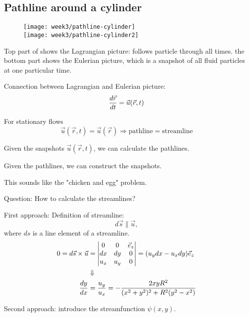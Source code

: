 \newpage
\subsection{Pathline around a cylinder}

\begin{figure}[!h]
    \centering
    \texttt{[image: week3/pathline-cylinder]}\\
    \texttt{[image: week3/pathline-cylinder2]}
    \caption{}
    \label{fig:pathline-cylinder}
\end{figure}

Top part of  shows the Lagrangian picture: follows particle through all times. the bottom part shows the Eulerian picture, which is a snapshot of all fluid particles at one particular time.

Connection between Lagrangian and Eulerian picture:
\begin{equation}
\frac{d \vec{r}}{d t} = \vec{u}(\vec{r},t)
\end{equation}

For stationary flows
\begin{equation}
\vec{u}(\vec{r},t)=\vec{u}(\vec{r}) \Rightarrow \mathrm{pathline} = \mathrm{streamline}
\end{equation}

Given the snapshots $\vec{u}(\vec{r},t)$, we can calculate the pathlines.

Given the pathlines, we can construct the snapshots.

This sounds like the "chicken and egg" problem.

\bigskip
Question: How to calculate the streamlines?

First approach:
Definition of streamline:
\begin{equation}
d\vec{s}\parallel\vec{u},
\end{equation}
where $ds$ is a line element of a streamline.
\begin{align}
0=d\vec{s}\times\vec{u} &=
\begin{vmatrix}
0 & 0 & \vec{e}_z \\
dx & dy & 0 \\
u_x & u_y & 0
\end{vmatrix} =
(u_ydx-u_xdy)\vec{e}_z\\
&\Downarrow\notag\\
\frac{d y}{d x} &= \frac{u_y}{u_x} = -\frac{2xyR^2}{(x^2+y^2)^2+R^2(y^2-x^2)}
\end{align}

Second approach: introduce the streamfunction $\psi(x,y)$.

